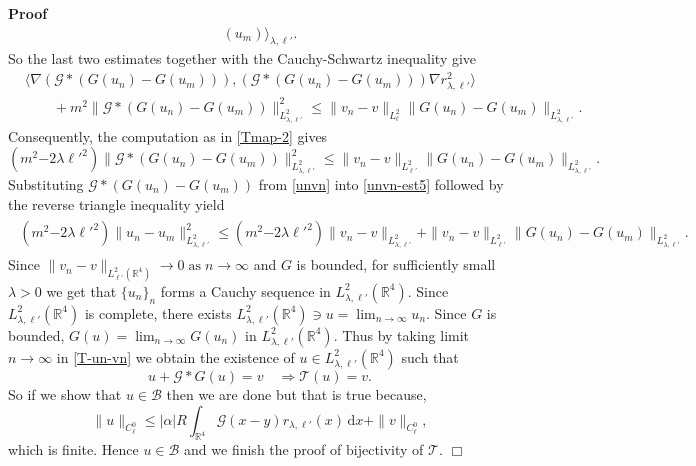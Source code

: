 \documentclass{article}
\newcommand{\mathd}{\mathrm{d}}
\newcommand{\tmop}[1]{\ensuremath{\operatorname{#1}}}
\newenvironment{proof}{\noindent\textbf{Proof\ }}{\hspace*{\fill}$\Box$\medskip}
\begin{document}
\begin{proof}
\begin{align}
      (u_m) \rangle_{\lambda, \ell'} .
     \label{unvn-est2}
  \end{align}
  So the last two estimates together with the Cauchy-Schwartz inequality give
  \begin{align}
      & \langle \nabla (\mathcal{G} \ast (G (u_n) - G (u_m))), (\mathcal{G}
      \ast (G (u_n) - G (u_m))) \nabla r_{\lambda, \ell'}^2 \rangle\\
      & \qquad + m^2 \| \mathcal{G} \ast (G (u_n) - G (u_m)) \|_{L^2_{\lambda,
      \ell'}}^2     \leqslant  \| v_n - v \|_{L^2_{\ell} } \| G (u_n) - G
      (u_m) \|_{L^2_{\lambda, \ell'}} .
    \label{unvn-est3}
  \end{align}
  Consequently, the computation as in \eqref{Tmap-2} gives
  \begin{equation}
      ( m^2 {- 2 \lambda \ell'}^2 ) \| \mathcal{G} \ast (G (u_n)
      - G (u_m)) \|_{L^2_{\lambda, \ell'}}^2
      \leqslant  \| v_n - v \|_{L^2_{\ell'}} \| G (u_n) - G
      (u_m) \|_{L^2_{\lambda, \ell'}} .
    \label{unvn-est5}
  \end{equation}
  Substituting $\mathcal{G} \ast (G (u_n) - G (u_m))$ from \eqref{unvn} into
  \eqref{unvn-est5} followed by the reverse triangle inequality yield
  \begin{align}
    \begin{array}{lll}
      ( m^2 {- 2 \lambda \ell'}^2 ) \| u_n - u_m \|_{L^2_{\lambda,
      \ell'}}^2  \leq  ( m^2 {- 2 \lambda \ell'}^2) \| v_n - v \|_{L^2_{\lambda, \ell'} }
       + \| v_n - v \|_{L^2_{\ell'}} \| G (u_n) - G (u_m)
      \|_{L^2_{\lambda, \ell'}} .
    \end{array} \label{unvn-est6}
  \end{align}
  Since $\| v_n - v \|_{L^2_{\ell'} (\mathbb{R}^4)} \rightarrow 0 \tmop{as} n
  \rightarrow \infty$ and $G$ is bounded, for sufficiently small $\lambda > 0$
  we get that $\{ u_n \}_n$ forms a Cauchy sequence in $L_{\lambda, \ell'}^2
  (\mathbb{R}^4)$. Since $L_{\lambda, \ell'}^2 (\mathbb{R}^4)$ is complete,
  there exists $L_{\lambda, \ell'}^2 (\mathbb{R}^4) \ni u = \lim_{n
  \rightarrow \infty} u_n$. Since $G$ is bounded, $G (u) = \lim_{n \rightarrow
  \infty} G (u_n)$ in $L_{\lambda, \ell'}^2 (\mathbb{R}^4)$. Thus by taking
  limit $n \rightarrow \infty$ in \eqref{T-un-vn} we obtain the existence of
  $u \in L_{\lambda, \ell'}^2 (\mathbb{R}^4)$ such that
  \[ 
       u +\mathcal{G} \ast G (u) = v  \quad \Rightarrow \mathcal{T} (u) = v.
      \]
  So if we show that $u \in \mathcal{B}$ then we are done but that is true
  because,
  \[ 
       \| u \|_{C_{\ell}^0} \leqslant  | \alpha |
       R \int_{\mathbb{R}^4} \mathcal{G} (x - y) r_{\lambda, \ell'} (x) \, \mathd
       x + \| v \|_{C_{\ell}^0},
      \]
  which is finite. Hence $u \in \mathcal{B}$ and we finish the proof of
  bijectivity of $\mathcal{T}$.
\end{proof}
\end{document}
